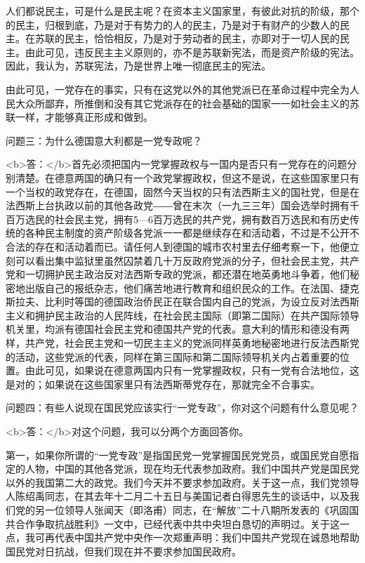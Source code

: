 人们都说民主，可是什么是民主呢？在资本主义国家里，有彼此对抗的阶级，那个的民主，归根到底，乃是对于有势力的人的民主，乃是对于有财产的少数人的民主。在苏联的民主，恰恰相反，乃是对于劳动者的民主，亦即对于一切人民的民主。由此可见，违反民主主义原则的，亦不是苏联新宪法，而是资产阶级的宪法。因此，我认为，苏联宪法，乃是世界上唯一彻底民主的宪法。

由此可见，一党存在的事实，只有在这党以外的其他党派已在革命过程中完全为人民大众所鄙弃，所推倒和没有其它党派存在的社会基础的国家一一如社会主义的苏联一样，才能够真正形成和做到。

问题三：为什么德国意大利都是一党专政呢？

<b>答：</b>首先必须把国内一党掌握政权与一国内是否只有一党存在的问题分别清楚。在德意两国的确只有一个政党掌握政权，但这不是说，在这些国家里只有一个当权的政党存在，在德国，固然今天当权的只有法西斯主义的国社党，但是在法西斯上台执政以前的其他各政党――曾在末次（一九三三年）国会选举时拥有千百万选民的社会民主党，拥有5—6百万选民的共产党，拥有数百万选民和有历史传统的各种民主制度的资产阶级各党派一一都是继续存在和活动着，不过是不公开不合法的存在和活动着而已。请任何人到德国的城市农村里去仔细考察一下，他便立刻可以看出集中监狱里虽然囚禁着几十万反政府党派的分子，但社会民主党，共产党和一切拥护民主政治反对法西斯专政的党派，都还潜在地英勇地斗争着，他们秘密地出版自己的报纸杂志，他们痛苦地进行教育和组织民众的工作。在法国、捷克斯拉夫、比利时等国的德国政治侨民正在联合国内自己的党派，为设立反对法西斯主义和拥护民主政治的人民阵线，在社会民主国际（即第二国际）在共产国际领导机关里，均派有德国社会民主党和德国共产党的代表。意大利的情形和德没有两样，共产党，社会民主党和一切民主主义的党派同样英勇地秘密地进行反法西斯党的活动，这些党派的代表，同样在第三国际和第二国际领导机关内占着重要的位置。由此可见，如果说在德意两国内只有一党掌握政权，只有一党有合法地位，这是对的；如果说在这些国家里只有法西斯蒂党存在，那就完全不合事实。

问题四：有些人说现在国民党应该实行“一党专政”，你对这个问题有什么意见呢？

<b>答：</b>对这个问题，我可以分两个方面回答你。

第一，如果你所谓的“一党专政”是指国民党一党掌握国民党党员，或国民党自愿指定的人物，中国的其他各党派，现在均无代表参加政府。我们中国共产党是国民党以外的我国第二大的政党。我们今天并不要求参加政府。关于这一点，我们党领导人陈绍禹同志，在其去年十二月二十五日与美国记者白得思先生的谈话中，以及我们党的另一位领导人张闻天（即洛甫）同志，在“解放”二十八期所发表的《巩固国共合作争取抗战胜利》一文中，已经代表中共中央坦白恳切的声明过。关于这一点，我可再代表中国共产党中央作一次郑重声明：我们中国共产党现在诚恳地帮助国民党对日抗战，但我们现在并不要求参加国民政府。

